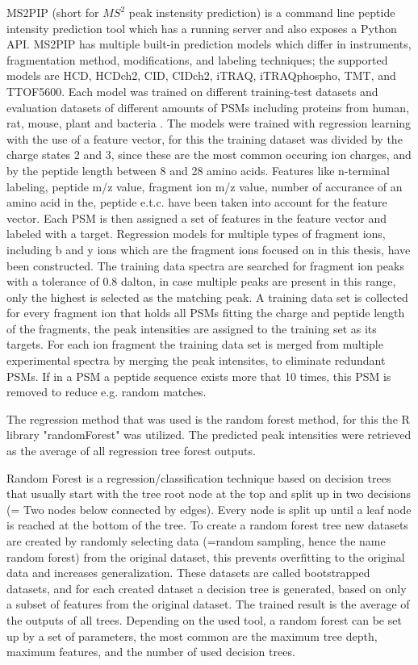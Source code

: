 \documentclass[11pt]{article}
\begin{document}
MS2PIP\cite{ms2pip, ms2pip-server} (short for \(MS^2\) peak instensity prediction) is a command line peptide intensity prediction tool which has a running server and also exposes a Python API. MS2PIP has multiple built-in prediction models which differ in instruments, fragmentation method, modifications, and labeling techniques; the supported models are HCD, HCDch2, CID, CIDch2, iTRAQ, iTRAQphospho, TMT, and TTOF5600. Each model was trained on different training-test datasets and evaluation datasets of different amounts of PSMs including proteins from human, rat, mouse, plant and bacteria \cite{ms2pip}. The models were trained with regression learning with the use of a feature vector, for this the training dataset was divided by the charge states 2 and 3, since these are the most common occuring ion charges, and by the peptide length between 8 and 28 amino acids. Features like n-terminal labeling, peptide m/z value, fragment ion m/z value, number of accurance of an amino acid in the, peptide e.t.c. have been taken into account for the feature vector. Each PSM is then assigned a set of features in the feature vector and labeled with a target. Regression models for multiple types of fragment ions, including b and y ions which are the fragment ions focused on in this thesis, have been constructed. The training data spectra are searched for fragment ion peaks with a tolerance of 0.8 dalton, in case multiple peaks are present in this range, only the highest is selected as the matching peak. A training data set is collected for every fragment ion that holds all PSMs fitting the charge and peptide length of the fragments, the peak intensities are assigned to the training set as its targets. For each ion fragment the training data set is merged from multiple experimental spectra by merging the peak intensites, to eliminate redundant PSMs. If in a PSM a peptide sequence exists more that 10 times, this PSM is removed to reduce e.g. random matches.

The regression method that was used is the random forest method, for this the R library "randomForest" was utilized. The predicted peak intensities were retrieved as the average of all regression tree forest outputs.

Random Forest \cite{random-forest} is a regression/classification technique based on decision trees that usually start with the tree root node at the top and split up in two decisions (= Two nodes below connected by edges). Every node is split up until a leaf node is reached at the bottom of the tree. To create a random forest tree new datasets are created by randomly selecting data (=random sampling, hence the name random forest) from the original dataset, this prevents overfitting to the original data and increases generalization. These datasets are called bootstrapped datasets, and for each created dataset a decision tree is generated, based on only a subset of features from the original dataset. The trained result is the average of the outputs of all trees. Depending on the used tool, a random forest can be set up by a set of parameters, the most common are the maximum tree depth, maximum features, and the number of used decision trees.
\end{document}
